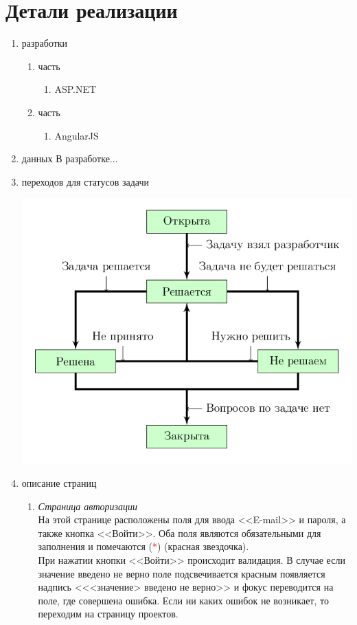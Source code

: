 \documentclass[14pt,a4paper]{extarticle}
\begin{document}
	\section {Детали реализации}
	\begin{enumerate}
		\item{ разработки}
		\begin{enumerate}
			\item { часть}
			\begin{enumerate}
				\item ASP.NET
			\end{enumerate}
			
			\item { часть}
			\begin{enumerate}
				\item AngularJS
			\end{enumerate}
		\end{enumerate}
		
		\item{ данных}
			В разработке...
			
		\item{ переходов для статусов задачи}
			\begin{center}
				\includegraphics[scale=0.5]{res/TransitionScheme/TransitionScheme.png} 
			\end{center}
			
		\item{ описание страниц}
			\begin{enumerate}
				\item{\it Страница авторизации}\\
				На этой странице расположены поля для ввода <<E-mail>> и пароля, а также кнопка <<Войти>>. Оба поля являются обязательными для заполнения и помечаются (\textcolor{red}{*}) (красная звездочка).\\
				При нажатии кнопки <<Войти>> происходит валидация. В случае если значение введено не верно поле подсвечивается красным появляется надпись <<<значение> введено не верно>> и фокус переводится на поле, где совершена ошибка. Если ни каких ошибок не возникает, то переходим на страницу проектов.
				

\end{enumerate}
\end{enumerate}
\end{document}
